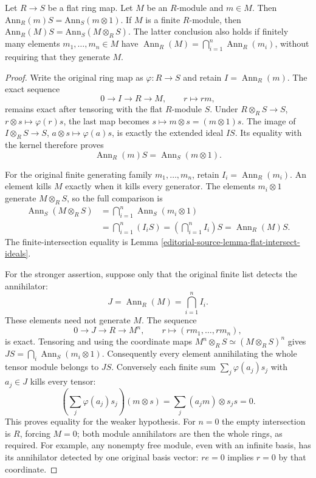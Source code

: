 \begin{lemma}
\label{editorial-source-lemma-annihilator-flat-base-change}
Let $R \to S$ be a flat ring map. Let $M$ be an $R$-module and
$m \in M$. Then $\text{Ann}_R(m) S = \text{Ann}_S(m \otimes 1)$.
If $M$ is a finite $R$-module, then
$\text{Ann}_R(M)S=\text{Ann}_S(M\otimes_R S)$.
The latter conclusion also holds if finitely many elements
$m_1,\ldots,m_n\in M$ have
$\operatorname{Ann}_R(M)=\bigcap_{i=1}^n\operatorname{Ann}_R(m_i)$,
without requiring that they generate $M$.
\end{lemma}

\begin{proof}
Write the original ring map as $\varphi:R\to S$ and retain
$I=\operatorname{Ann}_R(m)$. The exact sequence
$$
0\longrightarrow I\longrightarrow R\longrightarrow M,
\qquad r\longmapsto rm,
$$
remains exact after tensoring with the flat $R$-module $S$.
Under $R\otimes_RS\to S$, $r\otimes s\mapsto\varphi(r)s$,
the last map becomes $s\mapsto m\otimes s=(m\otimes1)s$.
The image of $I\otimes_RS\to S$, $a\otimes s\mapsto\varphi(a)s$,
is exactly the extended ideal $IS$. Its equality with the
kernel therefore proves
$$
\operatorname{Ann}_R(m)S=\operatorname{Ann}_S(m\otimes1).
$$

For the original finite generating family $m_1,\ldots,m_n$,
retain $I_i=\operatorname{Ann}_R(m_i)$. An element kills $M$
exactly when it kills every generator. The elements
$m_i\otimes1$ generate $M\otimes_RS$, so the full comparison is
\[
\begin{split}
\operatorname{Ann}_S(M\otimes_RS)
&=\bigcap_{i=1}^n\operatorname{Ann}_S(m_i\otimes1)\\
&=\bigcap_{i=1}^n(I_iS)
=\left(\bigcap_{i=1}^n I_i\right)S
=\operatorname{Ann}_R(M)S.
\end{split}
\]
The finite-intersection equality is
Lemma \ref{editorial-source-lemma-flat-intersect-ideals}.

For the stronger assertion, suppose only that the original
finite list detects the annihilator:
$$
J=\operatorname{Ann}_R(M)=\bigcap_{i=1}^n I_i.
$$
These elements need not generate $M$. The sequence
$$
0\longrightarrow J\longrightarrow R\longrightarrow M^n,
\qquad r\longmapsto(rm_1,\ldots,rm_n),
$$
is exact. Tensoring and using the coordinate maps
$M^n\otimes_RS\simeq(M\otimes_RS)^n$ gives
$JS=\bigcap_i\operatorname{Ann}_S(m_i\otimes1)$.
Consequently every element annihilating the whole tensor
module belongs to $JS$. Conversely each finite sum
$\sum_j\varphi(a_j)s_j$ with $a_j\in J$ kills every tensor:
$$
\left(\sum_j\varphi(a_j)s_j\right)(m\otimes s)
=\sum_j(a_jm)\otimes s_js=0.
$$
This proves equality for the weaker hypothesis. For $n=0$
the empty intersection is $R$, forcing $M=0$; both module
annihilators are then the whole rings, as required.
For example, any nonempty free module, even with an infinite
basis, has its annihilator detected by one original basis
vector: $re=0$ implies $r=0$ by that coordinate.


\end{proof}
